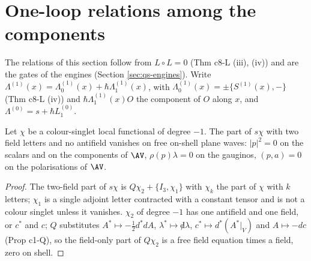 \section{One-loop relations among the components}
\label{sec:qs-relations}

The relations of this section follow from $L\circ L=0$ (Thm c8-L (iii), (iv)) and are the gates of the engines (Section \ref{sec:qs-engines}). Write $\Lambda^{(1)}(x)=\Lambda^{(1)}_0(x)+\hbar\Lambda^{(1)}_1(x)$, with $\Lambda^{(1)}_0(x)=\pm\{S^{(1)}(x),-\}$ (Thm c8-L (iv)) and $\hbar\Lambda^{(1)}_1(x)O$ the component of $O$ along $x$, and $\Lambda^{(0)}=s+\hbar L_1^{(0)}$.

\begin{lemma}
\label{lem:qs-onshell}
Let $\chi$ be a colour-singlet local functional of degree $-1$. The part of $s\chi$ with two field letters and no antifield vanishes on free on-shell plane waves: $|p|^2=0$ on the scalars and on the components of $\AV$, $\rho(p)\lambda=0$ on the gauginos, $(p,a)=0$ on the polarisations of $\AV$.
\end{lemma}

\begin{proof}
The two-field part of $s\chi$ is $Q\chi_2+\{I_3,\chi_1\}$ with $\chi_k$ the part of $\chi$ with $k$ letters; $\chi_1$ is a single adjoint letter contracted with a constant tensor and is not a colour singlet unless it vanishes. $\chi_2$ of degree $-1$ has one antifield and one field, or $c^*$ and $c$; $Q$ substitutes $A^*\mapsto-\tfrac12d^*dA$, $\lambda^*\mapsto{\not d}\lambda$, $c^*\mapsto d^*(A^*|_V)$ and $A\mapsto-dc$ (Prop c1-Q), so the field-only part of $Q\chi_2$ is a free field equation times a field, zero on shell.
\end{proof}

